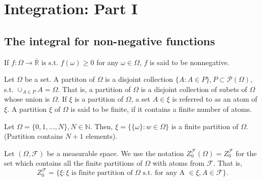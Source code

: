 \chapter{Integration: Part I}%
\label{cha:Integration: Part I}
\section{The integral for non-negative functions}%
\label{sec:The integral for non-negative functions}

If $f: \Omega \to \overline{\mathbb{R}}$ is s.t. $f(\omega)\ge 0$ for any $\omega \in \Omega$,
$f$ is said to be nonnegative.

\begin{definition}
    \label{def:8.1}
    Let $\Omega$ be a set. A partiton of $\Omega$ is a disjoint collection
    $\{A: A \in P\}, P \subset \mathcal{P}(\Omega)$, s.t. $\cup_{A \in P}A = \Omega$. That is,
    a partition of $\Omega$ is a disjoint collection of subets of $\Omega$ whose union is
    $\Omega$. If $\xi$ is a partition of $\Omega$, a set $A \in \xi$ is referred to as an atom
    of $\xi$. A partition $\xi \text{ of } \Omega$ is said to be finite, if it contains a
    finite number of atoms.
\end{definition}

\begin{example}
    \label{ex:8.1}
    Let $\Omega = \{0, 1, \ldots, N\} , N \in \mathbb{N}$. Then, $\xi = \{\{\omega\}:w \in 
    \Omega\} $ is a finite partition of $\Omega$. (Partition contains $N+1$ elements).
\end{example}

\begin{definition}[$Z_0^{\mathcal{F}}$]
    \label{def:8.2}
    Let $(\Omega, \mathcal{F})$ be a measurable space. We use the notation 
    $Z_0^{\mathcal{F}}(\Omega) =Z_0^{\mathcal{F}}$ for the set which contains all the finite
    partitions of $\Omega$ with atoms from $\mathcal{F}$. That is,
    \[
    Z_0^{\mathcal{F}} = \{\xi : \xi \text{ is finite partition of } \Omega\text{ s.t. for any A } 
    \in \xi, A \in \mathcal{F}\} 
    .\] 
\end{definition}

